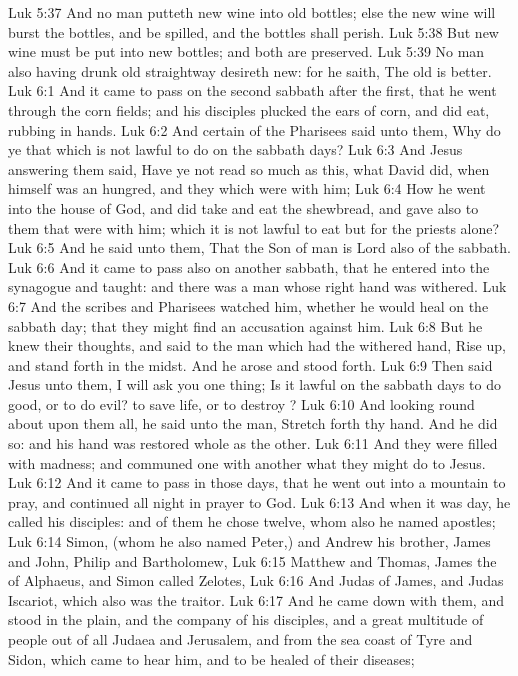 \vs Luk 5:37 And no man putteth new wine into old bottles; else the new wine will burst the bottles, and be spilled, and the bottles shall perish.
\vs Luk 5:38 But new wine must be put into new bottles; and both are preserved.
\vs Luk 5:39 No man also having drunk old  straightway desireth new: for he saith, The old is better.
\vs Luk 6:1 And it came to pass on the second sabbath after the first, that he went through the corn fields; and his disciples plucked the ears of corn, and did eat, rubbing  in  hands.
\vs Luk 6:2 And certain of the Pharisees said unto them, Why do ye that which is not lawful to do on the sabbath days?
\vs Luk 6:3 And Jesus answering them said, Have ye not read so much as this, what David did, when himself was an hungred, and they which were with him;
\vs Luk 6:4 How he went into the house of God, and did take and eat the shewbread, and gave also to them that were with him; which it is not lawful to eat but for the priests alone?
\vs Luk 6:5 And he said unto them, That the Son of man is Lord also of the sabbath.
\vs Luk 6:6 And it came to pass also on another sabbath, that he entered into the synagogue and taught: and there was a man whose right hand was withered.
\vs Luk 6:7 And the scribes and Pharisees watched him, whether he would heal on the sabbath day; that they might find an accusation against him.
\vs Luk 6:8 But he knew their thoughts, and said to the man which had the withered hand, Rise up, and stand forth in the midst. And he arose and stood forth.
\vs Luk 6:9 Then said Jesus unto them, I will ask you one thing; Is it lawful on the sabbath days to do good, or to do evil? to save life, or to destroy ?
\vs Luk 6:10 And looking round about upon them all, he said unto the man, Stretch forth thy hand. And he did so: and his hand was restored whole as the other.
\vs Luk 6:11 And they were filled with madness; and communed one with another what they might do to Jesus.
\vs Luk 6:12 And it came to pass in those days, that he went out into a mountain to pray, and continued all night in prayer to God.
\vs Luk 6:13 And when it was day, he called  his disciples: and of them he chose twelve, whom also he named apostles;
\vs Luk 6:14 Simon, (whom he also named Peter,) and Andrew his brother, James and John, Philip and Bartholomew,
\vs Luk 6:15 Matthew and Thomas, James the  of Alphaeus, and Simon called Zelotes,
\vs Luk 6:16 And Judas  of James, and Judas Iscariot, which also was the traitor.
\vs Luk 6:17 And he came down with them, and stood in the plain, and the company of his disciples, and a great multitude of people out of all Judaea and Jerusalem, and from the sea coast of Tyre and Sidon, which came to hear him, and to be healed of their diseases;
